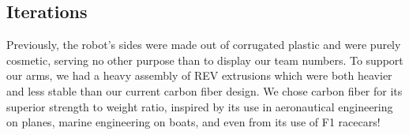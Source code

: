 

\subsection*{Iterations}
Previously, the robot’s sides were made out of corrugated plastic and were purely cosmetic, serving no other purpose than to display our team numbers. To support our arms, we had a heavy assembly of REV extrusions which were both heavier and less stable than our current carbon fiber design. We chose carbon fiber for its superior strength to weight ratio, inspired by its use in aeronautical engineering on planes, marine engineering on boats, and even from its use of F1 racecars!





